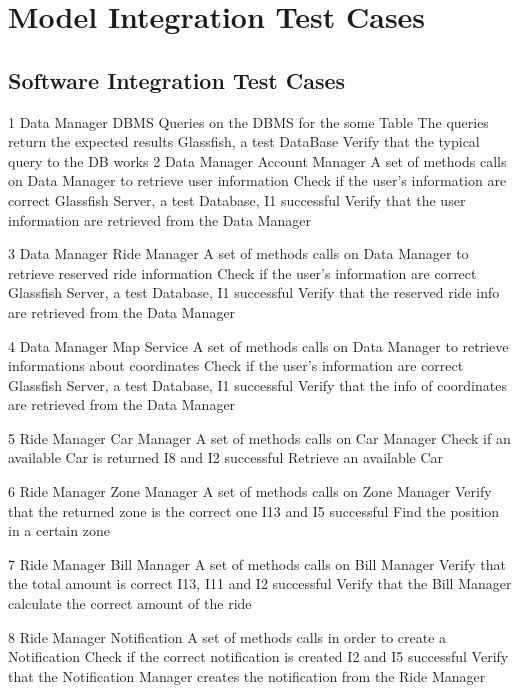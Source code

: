\section{Model Integration Test Cases}
\subsection{Software Integration Test Cases}
\testCase
	{1}
	{Data Manager}
	{DBMS}
	{Queries on the DBMS for the some Table }
	{The queries return the expected results}
	{Glassfish, a test DataBase}
	{Verify that the typical query to the DB works}
\testCase
	{2}
	{Data Manager}
	{Account Manager}
	{A set of methods calls on Data Manager to retrieve user information}
	{Check if the user's information are correct}
	{Glassfish Server, a test Database, I1 successful}
	{Verify that the user information are retrieved from the Data Manager}

\testCase
	{3}
	{Data Manager}
	{Ride Manager}
	{A set of methods calls on Data Manager to retrieve reserved ride information}
	{Check if the user's information are correct}
	{Glassfish Server, a test Database, I1 successful}
	{Verify that the reserved ride info are retrieved from the Data Manager}
	
\testCase
	{4}
	{Data Manager}
	{Map Service}
	{A set of methods calls on Data Manager to retrieve informations about coordinates}
	{Check if the user's information are correct}
	{Glassfish Server, a test Database, I1 successful}
	{Verify that the info of coordinates are retrieved from the Data Manager}

\testCase
	{5}
	{Ride Manager}
	{Car Manager}
	{A set of methods calls on Car Manager}
	{Check if an available Car is returned}
	{I8 and I2 successful}
	{Retrieve an available Car}

\testCase
	{6}
	{Ride Manager}
	{Zone Manager}
	{A set of methods calls on Zone Manager}
	{Verify that the returned zone is the correct one}
	{I13 and I5 successful}
	{Find the position in a certain zone}

\testCase
	{7}
	{Ride Manager}
	{Bill Manager}
	{A set of methods calls on Bill Manager}
	{Verify that the total amount is correct}
	{I13, I11 and I2 successful}
	{Verify that the Bill Manager calculate the correct amount of the ride}

\testCase
	{8}
	{Ride Manager}
	{Notification}
	{A set of methods calls in order to create a Notification}
	{Check if the correct notification is created}
	{I2 and I5 successful}
	{Verify that the Notification Manager creates the notification from the Ride Manager}
	
